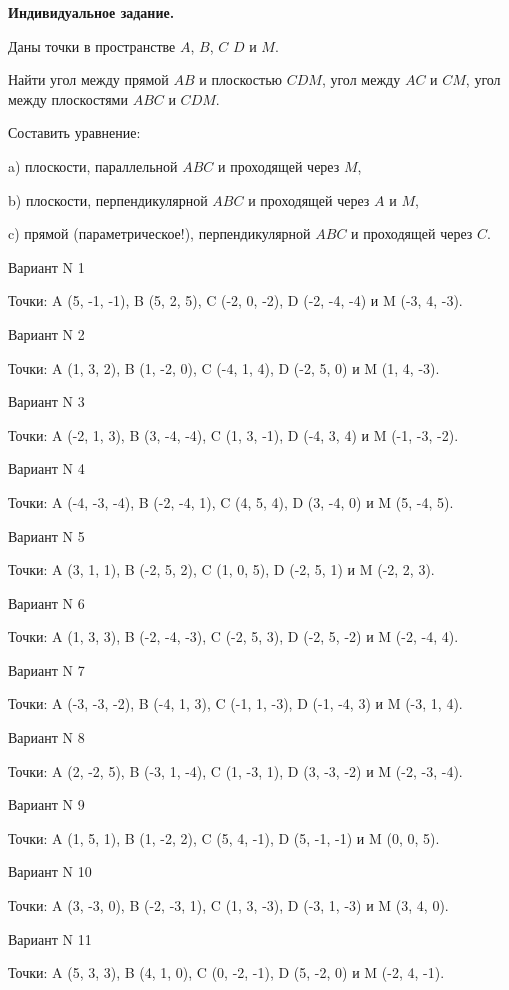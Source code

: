 \documentclass[11pt]{report}
\begin{document}
\pagestyle{empty}

{\bf Индивидуальное задание.}


Даны точки в пространстве
$A$, $B$, $C$ $D$ и $M$.

Найти угол между прямой $AB$ и плоскостью $CDM$, угол между $AC$ и $CM$, угол между плоскостями $ABC$ и $CDM$.

Составить уравнение: 

a) плоскости, параллельной $ABC$ и проходящей через $M$,

b) плоскости, перпендикулярной $ABC$ и проходящей через $A$ и $M$,

c) прямой (параметрическое!), перпендикулярной $ABC$ и проходящей через $C$.

Вариант N 1

Точки: A (5, -1, -1), B (5, 2, 5), C (-2, 0, -2), D (-2, -4, -4) и M (-3, 4, -3).

Вариант N 2

Точки: A (1, 3, 2), B (1, -2, 0), C (-4, 1, 4), D (-2, 5, 0) и M (1, 4, -3).

Вариант N 3

Точки: A (-2, 1, 3), B (3, -4, -4), C (1, 3, -1), D (-4, 3, 4) и M (-1, -3, -2).

Вариант N 4

Точки: A (-4, -3, -4), B (-2, -4, 1), C (4, 5, 4), D (3, -4, 0) и M (5, -4, 5).

Вариант N 5

Точки: A (3, 1, 1), B (-2, 5, 2), C (1, 0, 5), D (-2, 5, 1) и M (-2, 2, 3).

Вариант N 6

Точки: A (1, 3, 3), B (-2, -4, -3), C (-2, 5, 3), D (-2, 5, -2) и M (-2, -4, 4).

Вариант N 7

Точки: A (-3, -3, -2), B (-4, 1, 3), C (-1, 1, -3), D (-1, -4, 3) и M (-3, 1, 4).

Вариант N 8

Точки: A (2, -2, 5), B (-3, 1, -4), C (1, -3, 1), D (3, -3, -2) и M (-2, -3, -4).

Вариант N 9

Точки: A (1, 5, 1), B (1, -2, 2), C (5, 4, -1), D (5, -1, -1) и M (0, 0, 5).

Вариант N 10

Точки: A (3, -3, 0), B (-2, -3, 1), C (1, 3, -3), D (-3, 1, -3) и M (3, 4, 0).

Вариант N 11

Точки: A (5, 3, 3), B (4, 1, 0), C (0, -2, -1), D (5, -2, 0) и M (-2, 4, -1).
\end{document}
